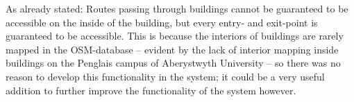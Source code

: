 As already stated: Routes passing through buildings cannot be guaranteed to be accessible on the inside of the building, but every entry- and exit-point is guaranteed to be accessible. This is because the interiors of buildings are rarely mapped in the OSM-database -- evident by the lack of interior mapping inside buildings on the Penglais campus of Aberystwyth University -- so there was no reason to develop this functionality in the system; it could be a very useful addition to further improve the functionality of the system however.